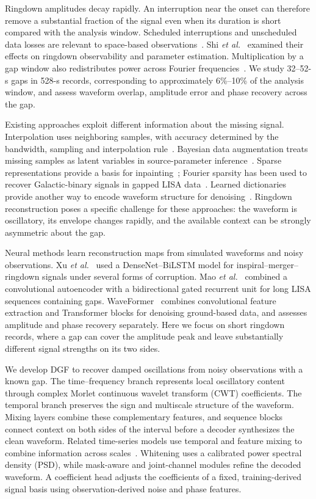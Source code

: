 \documentclass[10pt,prd,aps,a4paper,twocolumn,superscriptaddress,nofootinbib,floatfix]{revtex4-2}
\begin{document}
Ringdown amplitudes decay rapidly. An interruption near the onset can therefore remove a substantial fraction of the signal even when its duration is short compared with the analysis window. Scheduled interruptions and unscheduled data losses are relevant to space-based observations~\cite{Baghi2019,dey2021gaps}. Shi \textit{et al.}~\cite{shi2024effectsdatagapsringdown} examined their effects on ringdown observability and parameter estimation. Multiplication by a gap window also redistributes power across Fourier frequencies~\cite{Harris1978}. We study 32--52-s gaps in 528-s records, corresponding to approximately 6\%--10\% of the analysis window, and assess waveform overlap, amplitude error and phase recovery across the gap.

Existing approaches exploit different information about the missing signal. Interpolation uses neighboring samples, with accuracy determined by the bandwidth, sampling and interpolation rule~\cite{Horowitz1974,Maeland1988,Unser1999}. Bayesian data augmentation treats missing samples as latent variables in source-parameter inference~\cite{Baghi2019}. Sparse representations provide a basis for inpainting~\cite{Starck2010}; Fourier sparsity has been used to recover Galactic-binary signals in gapped LISA data~\cite{Blelly2021}. Learned dictionaries provide another way to encode waveform structure for denoising~\cite{TorresForne2016}. Ringdown reconstruction poses a specific challenge for these approaches: the waveform is oscillatory, its envelope changes rapidly, and the available context can be strongly asymmetric about the gap.

Neural methods learn reconstruction maps from simulated waveforms and noisy observations. Xu \textit{et al.}~\cite{Xu_2024} used a DenseNet--BiLSTM model for inspiral--merger--ringdown signals under several forms of corruption. Mao \textit{et al.}~\cite{Mao:2025cae} combined a convolutional autoencoder with a bidirectional gated recurrent unit for long LISA sequences containing gaps. WaveFormer~\cite{Wang:2024waveformer} combines convolutional feature extraction and Transformer blocks for denoising ground-based data, and assesses amplitude and phase recovery separately. Here we focus on short ringdown records, where a gap can cover the amplitude peak and leave substantially different signal strengths on its two sides.

We develop DGF to recover damped oscillations from noisy observations with a known gap. The time--frequency branch represents local oscillatory content through complex Morlet continuous wavelet transform (CWT) coefficients. The temporal branch preserves the sign and multiscale structure of the waveform. Mixing layers combine these complementary features, and sequence blocks connect context on both sides of the interval before a decoder synthesizes the clean waveform. Related time-series models use temporal and feature mixing to combine information across scales~\cite{TSMixer2023,TimeMixer2024}. Whitening uses a calibrated power spectral density (PSD), while mask-aware and joint-channel modules refine the decoded waveform. A coefficient head adjusts the coefficients of a fixed, training-derived signal basis using observation-derived noise and phase features.
\end{document}
